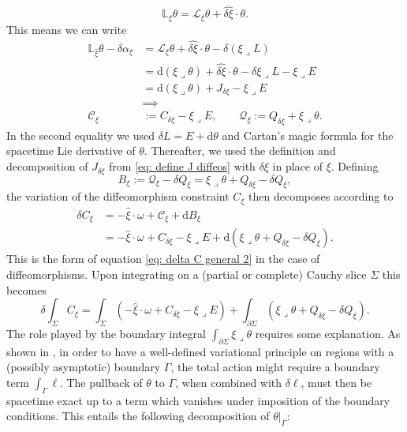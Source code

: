 \documentclass[]{jkpaper}
\theoremstyle{plain}
\theoremstyle{definition}
\newcommand{\sins}{\mathop{\lrcorner}}
\newcommand{\fins}{\cdot}
\newcommand{\sd}{\mathrm {d}}
\def\extd{\mathrm {d}}
\newcommand{\fd}{\delta}
\newcommand{\sL}{\mathcal{L}}
\newcommand{\fL}{\mathbb{L}}
\begin{document}
\begin{equation}
    \fL_\xi \theta = \sL_\xi \theta + \widehat{\delta \xi}\fins\theta.
\end{equation}
This means we can write
\begin{equation}\begin{split}
\label{eq: define mathcal Cxi, Qxi}
    \fL_{\hat{\xi}}\theta-\delta\alpha_{\xi}
    &=\sL_{\xi}\theta +\widehat{\fd\xi}\fins\theta - \delta (\xi\sins L)\\
    &=\sd(\xi\sins\theta) +\widehat{\fd\xi}\fins\theta - \delta\xi\sins L-\xi\sins E\\
    &=\sd(\xi\sins\theta)+ J_{\fd\xi}-\xi\sins E\\
    &\implies\\
    \mathcal{C}_{\xi}&:=C_{\fd\xi}-\xi\sins E,
    \qquad
    \mathcal{Q}_{\xi}:=Q_{\fd\xi}+\xi\sins\theta.
\end{split}\end{equation}
In the second equality we used $\fd L = E + \sd \theta$ and Cartan's magic formula for the spacetime Lie derivative of $\theta$.
Thereafter, we used the definition and decomposition of $J_{\delta\xi}$ from \eqref{eq: define J diffeos} with $\delta\xi$ in place of $\xi$.  Defining
\begin{equation}\label{eq: boundary term diffeos}
    B_\xi:=\mathcal{Q}_\xi-\fd Q_\xi
    =\xi\sins\theta+Q_{\fd\xi}-\fd Q_\xi,
\end{equation}
the variation of the diffeomorphism constraint $C_\xi$ then decomposes according to
\begin{equation}\begin{split}\label{eq: delta C diffeos}
    \delta C_{\xi} 
    &=-\hat{\xi}\cdot \omega + \mathcal{C}_{\xi}+\extd B_\xi\\
    &=-\hat{\xi}\cdot \omega +C_{\fd\xi}-\xi\sins E 
    +\sd(\xi\sins\theta+Q_{\fd\xi}-\delta Q_\xi).
\end{split}\end{equation}
This is the form of equation \eqref{eq: delta C general 2} in the case of diffeomorphisms. Upon integrating on a (partial or complete) Cauchy slice $\Sigma$ this becomes
\begin{equation}\label{eq: integrated constraint}
    \fd \int_\Sigma C_\xi =\int_{\Sigma}\left(-\hat{\xi}\fins\omega +C_{\fd\xi}-\xi\sins E\right)
    +\int_{\partial\Sigma}\left(\xi\sins\theta+Q_{\delta\xi}-\fd Q_\xi\right).
\end{equation}
The role played by the boundary integral $\int_{\partial\Sigma}\xi\sins\theta$ requires some explanation.  As shown in \cite{Harlow:2019yfa}, in order to have a well-defined variational principle on regions with a (possibly asymptotic) boundary $\Gamma$, the total action might require a boundary term $\int_\Gamma \ell$.  The pullback of $\theta$ to $\Gamma$, when combined with $\fd \ell$, must then be spacetime exact up to a term which vanishes under imposition of the boundary conditions.  This entails the following decomposition of $\theta|_{\Gamma}$:
\end{document}

